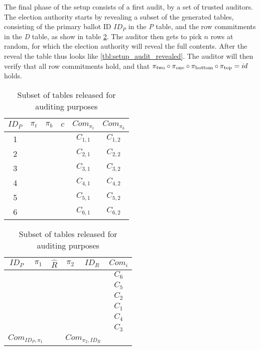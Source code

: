 The final phase of the setup consists of a first audit, by a set of trusted
auditors. The election authority starts by revealing a subset of the generated
tables, consisting of the primary ballot ID $ID_P$ in the \emph{P} table, and
the row commitments in the \emph{D} table, as show in table
\ref{tbl:setup_audit}. The auditor then gets to pick $n$ rows at random, for
which the election authority will reveal the full contents. After the reveal
the table thus looks like \ref{tbl:setup_audit_revealed}. The auditor will then
verify that all row commitments hold, and that $\pi_{\text{two}} \circ \pi_{\text{one}} \circ
\pi_{\text{bottom}} \circ \pi_{\text{top}} = id$ holds.

\begin{table}
	\centering
	\begin{subtable}{.5\linewidth}
		\begin{tabular}{|c|c|c|c|c|c|}
			\hline
			$ID_P$ & $\pi_{t}$ & $\pi_{b}$ & $c$ & $Com_{\pi_{t}}$ & $Com_{\pi_{b}}$ \\
			\hline
			1 & & & & $C_{1, 1}$ & $C_{1, 2}$ \\
			2 & & & & $C_{2, 1}$ & $C_{2, 2}$ \\
			3 & & & & $C_{3, 1}$ & $C_{3, 2}$ \\
			4 & & & & $C_{4, 1}$ & $C_{4, 2}$ \\
			5 & & & & $C_{5, 1}$ & $C_{5, 2}$ \\
			6 & & & & $C_{6, 1}$ & $C_{6, 2}$ \\
			\hline
		\end{tabular}
	\end{subtable}%
	\begin{subtable}{.5\linewidth}
		\begin{tabular}{|c|c|c|c|c|c|}
			\hline
			$ID_P$ & $\pi_1$ & $\hat{R}$ & $\pi_2$ & $ID_R$ & $Com_{i}$ \\
			\hline
			& & & & & $C_6$ \\
			& & & & & $C_5$ \\
			& & & & & $C_2$ \\
			& & & & & $C_1$ \\
			& & & & & $C_4$ \\
			& & & & & $C_3$ \\
			\hline
			\multicolumn{2}{|c|}{$Com_{ID_P, \pi_1}$} &   & \multicolumn{2}{c|}{$Com_{\pi_2, ID_R}$} & \\
			\hline
		\end{tabular}
	\end{subtable}
	\caption{Subset of tables released for auditing purposes}
	\label{tbl:setup_audit}
\end{table}


